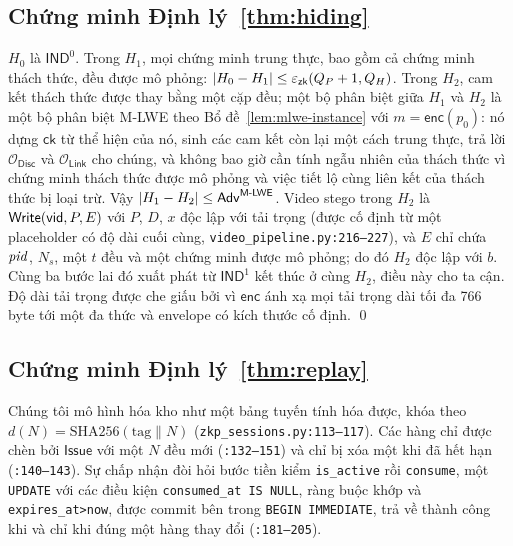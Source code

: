 \subsection{Chứng minh Định lý~\ref{thm:hiding}}

$H_0$ là $\mathsf{IND}^0$. Trong $H_1$, mọi chứng minh trung thực, bao gồm cả
chứng minh thách thức, đều được mô phỏng: $|H_0-H_1|\le\varepsilon_{\mathsf{zk}}(Q_P+1,Q_H)$.
Trong $H_2$, cam kết thách thức được thay bằng một cặp đều; một bộ phân biệt
giữa $H_1$ và $H_2$ là một bộ phân biệt M-LWE theo Bổ đề~\ref{lem:mlwe-instance}
với $m=\mathsf{enc}(p_0)$: nó dựng $\mathsf{ck}$ từ thể hiện của nó, sinh các
cam kết còn lại một cách trung thực, trả lời $\mathcal O_{\mathsf{Disc}}$ và
$\mathcal O_{\mathsf{Link}}$ cho chúng, và không bao giờ cần tính ngẫu nhiên của
thách thức vì chứng minh thách thức được mô phỏng và việc tiết lộ cùng liên kết
của thách thức bị loại trừ. Vậy $|H_1-H_2|\le\mathsf{Adv}^{\textsf{M-LWE}}$. Video stego trong
$H_2$ là $\mathsf{Write}(\mathsf{vid},P,E)$ với $P$, $D$, $x$ độc lập với tải trọng
(được cố định từ một placeholder có độ dài cuối cùng,
\texttt{video\_pipeline.py:216--227}), và $E$ chỉ chứa $\mathit{pid}$, $N_s$, một
$t$ đều và một chứng minh được mô phỏng; do đó $H_2$ độc lập với $b$. Cùng ba
bước lai đó xuất phát từ $\mathsf{IND}^1$ kết thúc ở cùng $H_2$, điều này cho
ta cận. Độ dài tải trọng được che giấu bởi vì $\mathsf{enc}$ ánh xạ mọi tải
trọng dài tối đa 766 byte tới một đa thức và envelope có kích thước cố định. \qed

\subsection{Chứng minh Định lý~\ref{thm:replay}}

Chúng tôi mô hình hóa kho như một bảng tuyến tính hóa được, khóa theo
$d(N)=\mathrm{SHA256}(\text{tag}\|N)$ (\texttt{zkp\_sessions.py:113--117}).
Các hàng chỉ được chèn bởi $\mathsf{Issue}$ với một $N$ đều mới
(\texttt{:132--151}) và chỉ bị xóa một khi đã hết hạn (\texttt{:140--143}).
Sự chấp nhận đòi hỏi bước tiền kiểm \texttt{is\_active} rồi
\texttt{consume}, một \texttt{UPDATE} với các điều kiện
\texttt{consumed\_at IS NULL}, ràng buộc khớp và \texttt{expires\_at>now},
được commit bên trong \texttt{BEGIN IMMEDIATE}, trả về thành công khi và chỉ
khi đúng một hàng thay đổi (\texttt{:181--205}).

